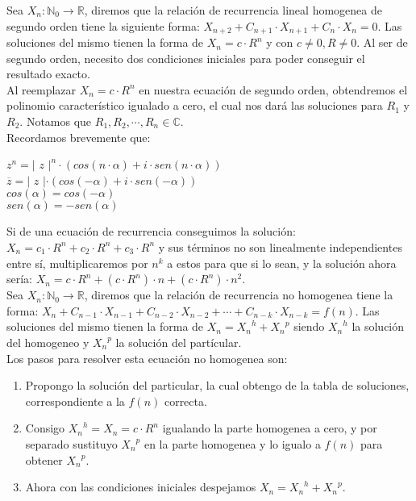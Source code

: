 \documentclass[titlepage,a4paper,12pt,twoside]{article}
\begin{document}
Sea $X_{n}: \mathbb{N}_{0} \rightarrow \mathbb{R}$, diremos que la relación de recurrencia lineal homogenea de segundo orden tiene la siguiente forma: $X_{n+2} + C_{n+1} \cdot X_{n+1} + C_{n} \cdot X_{n} = 0$. Las soluciones del mismo tienen la forma de $X_{n} = c \cdot R^n$ y con $c \neq 0, R \neq 0$. Al ser de segundo orden, necesito dos condiciones iniciales para poder conseguir el resultado exacto.\\

Al reemplazar $X_{n} = c \cdot R^n$ en nuestra ecuación de segundo orden, obtendremos el polinomio característico igualado a cero, el cual nos dará las soluciones para $R_{1}$ y $R_{2}$. Notamos que $R_{1}, R_{2}, \cdots , R_{n} \in \mathbb{C}$.\\

Recordamos brevemente que:
\begin{flushleft}
$z^n = | $ $z $ $|^n \cdot (cos(n \cdot \alpha )+i \cdot sen(n \cdot \alpha ))$\\
$\overline{z} = | $ $z $ $| \cdot (cos(-\alpha )+i \cdot sen(-\alpha ))$\\
$cos(\alpha) = cos(-\alpha)$\\
$sen(\alpha) = -sen(\alpha)$\\
\end{flushleft}

Si de una ecuación de recurrencia conseguimos la solución:\\ $X_{n} = c_{1} \cdot R^n + c_{2} \cdot R^n + c_{3} \cdot R^n$ y sus términos no son linealmente independientes entre sí, multiplicaremos por $n^k$ a estos para que si lo sean, y la solución ahora sería: $X_{n} = c \cdot R^n + (c \cdot R^n) \cdot n + (c \cdot R^n) \cdot n^2$.\\

Sea $X_{n}: \mathbb{N}_{0} \rightarrow \mathbb{R}$, diremos que la relación de recurrencia no homogenea tiene la  forma: $X_{n} + C_{n-1} \cdot X_{n-1} + C_{n-2} \cdot X_{n-2} + \cdots + C_{n-k} \cdot X_{n-k} = f(n)$. Las soluciones del mismo tienen la forma de $X_{n} = {X_{n}}^h + {X_{n}}^p$ siendo ${X_{n}}^h$ la solución del homogeneo y ${X_{n}}^p$ la solución del partícular.\\

Los pasos para resolver esta ecuación no homogenea son:
\begin{enumerate}
\item Propongo la solución del particular, la cual obtengo de la tabla de soluciones, correspondiente a la $f(n)$ correcta.
\item Consigo ${X_{n}}^h = X_{n} = c \cdot R^n$ igualando la parte homogenea a cero, y por separado sustituyo  ${X_{n}}^p$ en la parte homogenea y lo igualo a $f(n)$ para obtener ${X_{n}}^p$.
\item Ahora con las condiciones iniciales despejamos $X_{n} = {X_{n}}^h + {X_{n}}^p$.
\end{enumerate}
\end{document}
